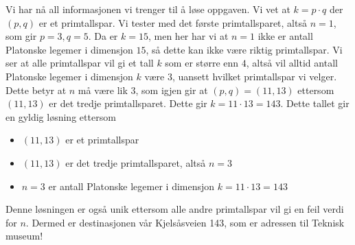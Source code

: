 Vi har nå all informasjonen vi trenger til å løse oppgaven. Vi vet at $k=p\cdot q$ der $(p,q)$ er et primtallspar. Vi tester med det første primtallsparet, altså $n=1$, som gir $p=3, q=5$. Da er $k = 15$, men her har vi at $n=1$ ikke er antall Platonske legemer i dimensjon $15$, så dette kan ikke være riktig primtallspar. Vi ser at alle primtallspar vil gi et tall $k$ som er større enn $4$, altså vil alltid antall Platonske legemer i dimensjon $k$ være $3$, uansett hvilket primtallspar vi velger. Dette betyr at $n$ må være lik $3$, som igjen gir at $(p,q) = (11,13)$ ettersom $(11,13)$ er det tredje primtallsparet. Dette gir $k=11\cdot 13 = 143$. Dette tallet gir en gyldig løsning ettersom

\begin{itemize}
    \item $(11,13)$ er et primtallspar
    \item $(11,13)$ er det tredje primtallsparet, altså $n=3$
    \item $n=3$ er antall Platonske legemer i dimensjon $k=11\cdot 13 = 143$
\end{itemize}

Denne løsningen er også unik ettersom alle andre primtallspar vil gi en feil verdi for $n$. Dermed er destinasjonen vår Kjelsåsveien 143, som er adressen til Teknisk museum!